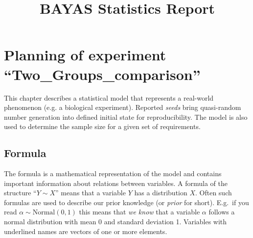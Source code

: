 \documentclass[11pt]{scrartcl}\usepackage[]{graphicx}\usepackage[table]{xcolor}
\begin{document}


\title{BAYAS Statistics Report}
\subtitle{}
\author{}
\maketitle


\section{Planning of experiment ``Two\_Groups\_comparison''}




This chapter describes a statistical model that represents a real-world phenomenon (e.g. a biological experiment). 
Reported \textit{seeds} bring quasi-random number generation into defined initial state for reproducibility. The model is also used to determine the sample size for a given set of requirements. \subsection{Formula}
The formula is a mathematical representation of the model and contains important information about relations between variables. A formula of the structure ``$Y \sim X$'' means that a variable $Y$ has a distribution $X$.
Often such formulas are used to describe our prior knowledge (or \textit{prior} for short). E.g.\ if you read $\alpha \sim \text{Normal}(0,1)$ this means that \emph{we know} that a variable $\alpha$ follows a normal distribution with mean 0 and standard deviation 1. 
Variables with underlined names are vectors of one or more elements. 
\end{document}
